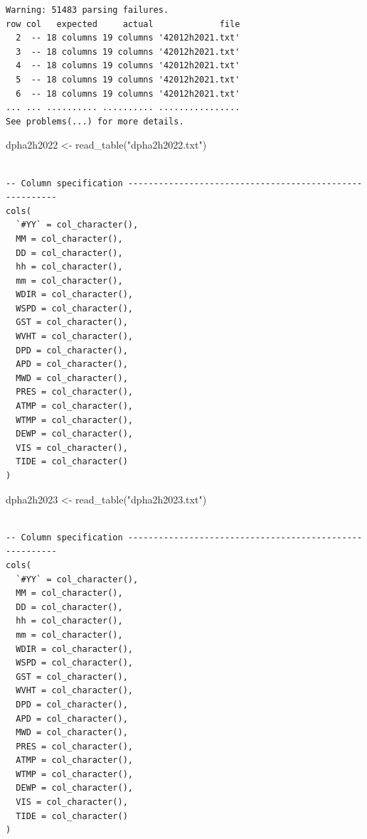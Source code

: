 \documentclass[
  letterpaper,
  DIV=11,
  numbers=noendperiod]{scrreprt}
\newenvironment{Shaded}{\begin{snugshade}}{\end{snugshade}}
\newcommand{\FunctionTok}[1]{\textcolor[rgb]{0.28,0.35,0.67}{#1}}
\newcommand{\NormalTok}[1]{\textcolor[rgb]{0.00,0.23,0.31}{#1}}
\newcommand{\OtherTok}[1]{\textcolor[rgb]{0.00,0.23,0.31}{#1}}
\newcommand{\StringTok}[1]{\textcolor[rgb]{0.13,0.47,0.30}{#1}}
\begin{document}
\begin{verbatim}
Warning: 51483 parsing failures.
row col   expected     actual             file
  2  -- 18 columns 19 columns '42012h2021.txt'
  3  -- 18 columns 19 columns '42012h2021.txt'
  4  -- 18 columns 19 columns '42012h2021.txt'
  5  -- 18 columns 19 columns '42012h2021.txt'
  6  -- 18 columns 19 columns '42012h2021.txt'
... ... .......... .......... ................
See problems(...) for more details.
\end{verbatim}

\begin{Shaded}
\begin{Highlighting}[]
\NormalTok{dpha2h2022 }\OtherTok{\textless{}{-}} \FunctionTok{read\_table}\NormalTok{(}\StringTok{"dpha2h2022.txt"}\NormalTok{)}
\end{Highlighting}
\end{Shaded}

\begin{verbatim}

-- Column specification --------------------------------------------------------
cols(
  `#YY` = col_character(),
  MM = col_character(),
  DD = col_character(),
  hh = col_character(),
  mm = col_character(),
  WDIR = col_character(),
  WSPD = col_character(),
  GST = col_character(),
  WVHT = col_character(),
  DPD = col_character(),
  APD = col_character(),
  MWD = col_character(),
  PRES = col_character(),
  ATMP = col_character(),
  WTMP = col_character(),
  DEWP = col_character(),
  VIS = col_character(),
  TIDE = col_character()
)
\end{verbatim}

\begin{Shaded}
\begin{Highlighting}[]
\NormalTok{dpha2h2023 }\OtherTok{\textless{}{-}} \FunctionTok{read\_table}\NormalTok{(}\StringTok{"dpha2h2023.txt"}\NormalTok{)}
\end{Highlighting}
\end{Shaded}

\begin{verbatim}

-- Column specification --------------------------------------------------------
cols(
  `#YY` = col_character(),
  MM = col_character(),
  DD = col_character(),
  hh = col_character(),
  mm = col_character(),
  WDIR = col_character(),
  WSPD = col_character(),
  GST = col_character(),
  WVHT = col_character(),
  DPD = col_character(),
  APD = col_character(),
  MWD = col_character(),
  PRES = col_character(),
  ATMP = col_character(),
  WTMP = col_character(),
  DEWP = col_character(),
  VIS = col_character(),
  TIDE = col_character()
)
\end{verbatim}
\end{document}
